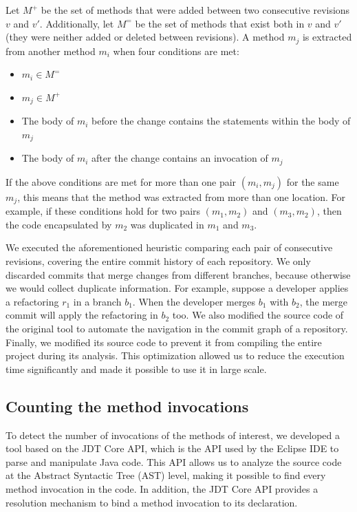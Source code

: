 Let $M^+$ be the set of methods that were added between two consecutive revisions $v$ and $v'$. Additionally, let $M^=$ be the set of methods that exist both in $v$ and $v'$ (they were neither added or deleted between revisions).
A method $m_j$ is extracted from another method $m_i$ when four conditions are met:
\begin{itemize}
\item $m_i \in M^=$
\item $m_j \in M^+$
\item The body of $m_i$ before the change contains the statements within the body of $m_j$
\item The body of $m_i$ after the change contains an invocation of $m_j$
\end{itemize}
If the above conditions are met for more than one pair $(m_i, m_j)$ for the same $m_j$, this means that the method was extracted from more than one location.
For example, if these conditions hold for two pairs $(m_1, m_2)$ and $(m_3, m_2)$, then the code encapsulated by $m_2$ was duplicated in $m_1$ and $m_3$.

We executed the aforementioned heuristic comparing each pair of consecutive revisions, covering the entire commit history of each repository.
We only discarded commits that merge changes from different branches, because otherwise we would collect duplicate information. For example, suppose a developer applies a refactoring $r_1$ in a branch $b_1$. When the developer merges $b_1$ with $b_2$, the merge commit will apply the refactoring in $b_2$ too.
We also modified the source code of the original tool to automate the navigation in the commit graph of a repository. Finally, we modified its source code to prevent it from compiling the entire project during its analysis. This optimization allowed us to reduce the execution time significantly and made it possible to use it in large scale.


\subsection{Counting the method invocations}
\label{sinvocationcount}

To detect the number of invocations of the methods of interest, we developed a tool based on the JDT Core API, which is the API used by the Eclipse IDE to parse and manipulate Java code. This API allows us to analyze the source code at the Abstract Syntactic Tree (AST) level, making it possible to find every method invocation in the code. In addition, the JDT Core API provides a resolution mechanism to bind a method invocation to its declaration.

